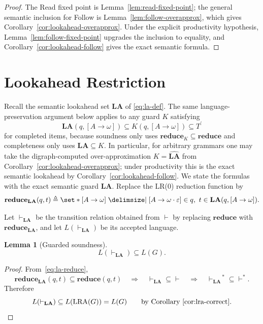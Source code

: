 \documentclass[11pt,a4paper]{article}
\theoremstyle{prettyplain}
\newtheorem{lemma}[theorem]{Lemma}
\theoremstyle{prettydef}
\def\mid{\;\delimsize\vert\;}#1%
\newcommand{\eps}{\varepsilon}
\newcommand{\LRA}{\mathrm{LRA}}
\newcommand{\Item}[2]{[#1\to #2]}
\newcommand{\Look}{\mathbf{LA}}
\newcommand{\Reduce}{\mathbf{reduce}}
\begin{document}
\begin{proof}
The Read fixed point is Lemma~\ref{lem:read-fixed-point}; the general semantic
inclusion for Follow is Lemma~\ref{lem:follow-overapprox}, which gives
Corollary~\ref{cor:lookahead-overapprox}.  Under the explicit productivity
hypothesis, Lemma~\ref{lem:follow-fixed-point} upgrades the inclusion to equality,
and Corollary~\ref{cor:lookahead-follow} gives the exact semantic formula.
\end{proof}


\section{Lookahead Restriction}

Recall the semantic lookahead set \(\Look\) of \eqref{eq:la-def}.  The same
language-preservation argument below applies to any guard \(K\) satisfying
\[
\Look(q,\Item{A}{\omega})\subseteq K(q,\Item{A}{\omega})
\subseteq T^\prime
\]
for completed items, because soundness only uses
\(\Reduce_K\subseteq\Reduce\) and completeness only uses
\(\Look\subseteq K\).  In particular, for arbitrary grammars one may take the
digraph-computed over-approximation \(K=\widehat{\Look}\) from
Corollary~\ref{cor:lookahead-overapprox}; under productivity this is the exact
semantic lookahead by Corollary~\ref{cor:lookahead-follow}.  We state the formulas
with the exact semantic guard \(\Look\).  Replace the LR(0)
reduction function by
\begin{equation}\label{eq:la-reduce}
\Reduce_{\Look}(q,t)
\triangleq
\set*{\Item{A}{\omega}
\mid
\Item{A}{\omega\cdot\eps}\in q,\
t\in\Look(q,\Item{A}{\omega})}.
\end{equation}

Let \(\vdash_{\Look}\) be the transition relation obtained from
\(\vdash\) by replacing \(\Reduce\) with \(\Reduce_{\Look}\), and let
\(L(\vdash_{\Look})\) be its accepted language.

\begin{lemma}[Guarded soundness]\label{lem:lookahead-sound}
\[
L(\vdash_{\Look})\subseteq L(G).
\]
\end{lemma}

\begin{proof}
From~\eqref{eq:la-reduce},
\[
\Reduce_{\Look}(q,t)\subseteq\Reduce(q,t)
\quad\Longrightarrow\quad
{\vdash_{\Look}}\subseteq{\vdash}
\quad\Longrightarrow\quad
{\vdash_{\Look}}^{\,*}\subseteq{\vdash}^*.
\]
Therefore
\begin{equation}\label{eq:la-sound}
L(\vdash_{\Look})
\subseteq
L(\LRA(G))
=
L(G)
\qquad\text{by Corollary~\ref{cor:lra-correct}.}
\end{equation}
\end{proof}
\end{document}
